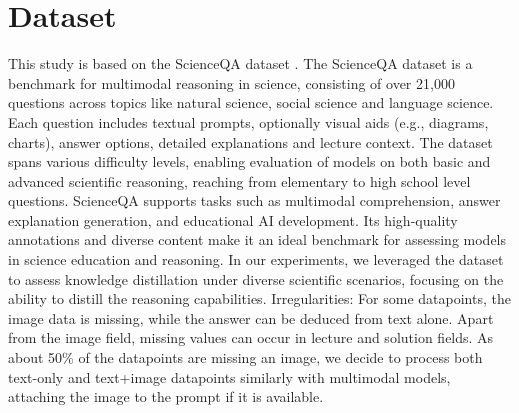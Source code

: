 \documentclass{article}
\begin{document}

\section{Dataset}
\label{dataset}
This study is based on the ScienceQA dataset \cite{lu2022learn}. The ScienceQA dataset is a benchmark for multimodal reasoning in science, consisting of over 21,000 questions across topics like natural science, social science and language science. Each question includes textual prompts, optionally visual aids (e.g., diagrams, charts), answer options, detailed explanations and lecture context. The dataset spans various difficulty levels, enabling evaluation of models on both basic and advanced scientific reasoning, reaching from elementary to high school level questions.
ScienceQA supports tasks such as multimodal comprehension, answer explanation generation, and educational AI development. Its high-quality annotations and diverse content make it an ideal benchmark for assessing models in science education and reasoning. In our experiments, we leveraged the dataset to assess knowledge distillation under diverse scientific scenarios, focusing on the ability to distill the reasoning capabilities.
Irregularities:
For some datapoints, the image data is missing, while the answer can be deduced from text alone.
Apart from the image field, missing values can occur in lecture and solution fields.
As about 50\% of the datapoints are missing an image, we decide to process both text-only and text+image datapoints similarly with multimodal models, attaching the image to the prompt if it is available.
\end{document}
